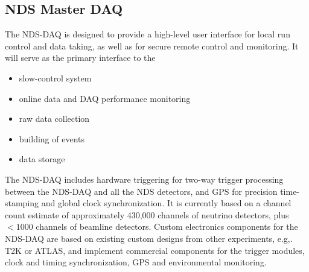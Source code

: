 \subsection{NDS Master DAQ} %
\label{sec:nd-master-daq}

The NDS-DAQ %
is designed to provide a high-level user interface 
for local run control and data taking, as well as for secure remote control and monitoring.   It will 
serve as the primary interface to the 
\begin{itemize}
\item slow-control system 
\item online data and DAQ performance monitoring  
\item raw data collection
\item building of events
\item data storage   
\end{itemize}
The NDS-DAQ includes hardware triggering 
for two-way trigger processing between the NDS-DAQ  and all the NDS detectors, and 
 GPS for precision 
time-stamping and global clock synchronization.  It  is currently based on a channel count 
estimate of approximately 430,000 channels of neutrino detectors, plus $<1000$ channels of 
beamline detectors.  Custom electronics components for the NDS-DAQ are based on existing 
custom designs from other experiments, e.g,. T2K or ATLAS,  and %
implement commercial components for the trigger modules, clock and timing synchronization, GPS and environmental 
monitoring.



